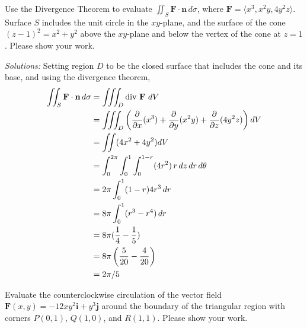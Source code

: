 \ifnum {}

    \question[4] Use the Divergence Theorem to evaluate $\iint_S \mathbf F \cdot \mathbf n \, d\sigma$, where $\mathbf F = \langle x^3, x^2y, 4y^2z \rangle$. Surface $S$ includes the unit circle in the $xy$-plane, and the surface of the cone $(z-1)^2=x^2+y^2$ above the $xy$-plane and below the vertex of the cone at $z=1$. Please show your work. 
    
    \ifnum {} {\color{DarkBlue}  \textit{Solutions:} Setting region $D$ to be the closed surface that includes the cone and its base, and using the divergence theorem,
    \begin{align*}
        \iint_S \mathbf F \cdot \mathbf n \, d\sigma 
        &= \iiint_D \text{div } \mathbf F \ dV \\
        &= \iiint_D \left( \frac{\partial}{\partial x} (x^3) + \frac{\partial}{\partial y}( x^2y) + \frac{\partial}{\partial z}( 4y^2z) \right) dV\\
        &= \iint (4x^2 + 4y^2) dV \\
        &= \int_0^{2\pi} \int_0^1 \int_0^{1-r} (4r^2 ) \, r \, dz \, dr \, d\theta \\
        &= 2\pi \int_0^1 (1-r) 4r^3 \, dr  \\
        &= 8\pi \int_0^1 (r^3-r^4) \, dr  \\
        &= 8\pi  (\frac14 - \frac 15)   \\
        &= 8\pi  \left(\frac{5}{20} - \frac {4}{20} \right)   \\
        &= 2\pi/5  
    \end{align*}
    } 
   \else
      
   \fi
    
\fi




\ifnum {}

    \question[4]  Evaluate the counterclockwise circulation of the vector field $\mathbf F (x,y) = -12xy^2\mathbf i + y^3 \mathbf j$ around the boundary of the triangular region with corners $P(0,1)$, $Q(1,0)$, and $R(1,1)$.  Please show your work. 
    
